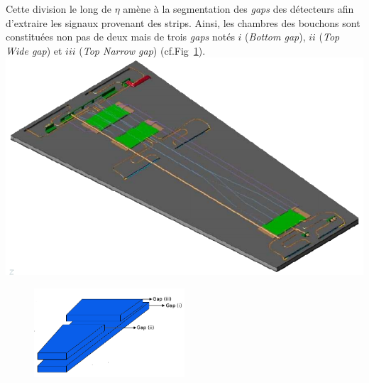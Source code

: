 Cette division le long de $\eta$ amène à la segmentation des \textit{gaps} des détecteurs afin d'extraire les signaux provenant des strips. Ainsi, les chambres des bouchons sont constituées non pas de deux mais de trois \textit{gaps} notés $i$ (\textit{Bottom gap}), $ii$ (\textit{Top Wide gap}) et $iii$ (\textit{Top Narrow gap})
 (cf.Fig~\ref{gapslayout}). 
\marginpar
{
	\centering
	\includegraphics[width=\marginparwidth]{RPC/schemerpc.png}
	\label{trap}
}
\begin{figure}[ht!]
	\centering
	\includegraphics[width=0.50\textwidth]{RPC/gaps.png}
	\label{gapslayout}
\end{figure}

\vspace{-0.8cm}
